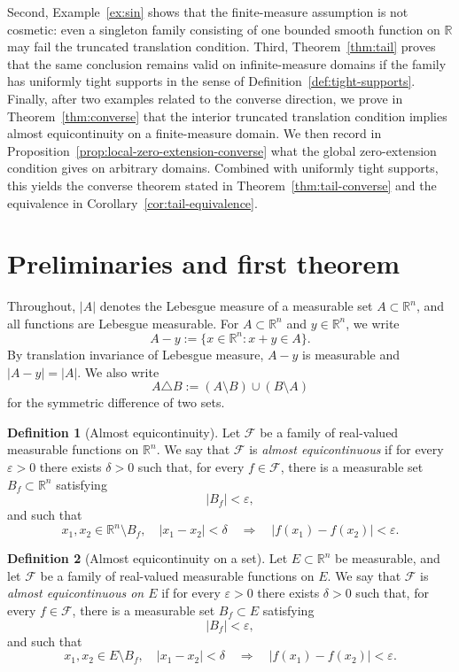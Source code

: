 \documentclass[11pt]{article}
\theoremstyle{plain}
\theoremstyle{definition}
\newtheorem{definition}{Definition}
\theoremstyle{remark}
\newcommand{\R}{\mathbb{R}}
\newcommand{\F}{\mathcal{F}}
\newcommand{\eps}{\varepsilon}
\newcommand{\meas}[1]{\lvert #1\rvert}
\begin{document}
Second, Example~\ref{ex:sin} shows that the finite-measure assumption is not
cosmetic: even a singleton family consisting of one bounded smooth function on
$\R$ may fail the truncated translation condition. Third,
Theorem~\ref{thm:tail} proves that the same conclusion remains valid on
infinite-measure domains if the family has uniformly tight supports in the
sense of Definition~\ref{def:tight-supports}. Finally, after two examples
related to the converse direction, we
prove in Theorem~\ref{thm:converse} that the interior truncated translation
condition implies almost equicontinuity on a finite-measure domain. We then
record in Proposition~\ref{prop:local-zero-extension-converse} what the
global zero-extension condition gives on arbitrary domains. Combined with
uniformly tight supports, this yields the converse theorem stated in
Theorem~\ref{thm:tail-converse} and the equivalence in
Corollary~\ref{cor:tail-equivalence}.

\section{Preliminaries and first theorem}

Throughout, $\meas{A}$ denotes the Lebesgue measure of a measurable set
$A\subset\R^n$, and all functions are Lebesgue measurable. For
$A\subset\R^n$ and $y\in\R^n$, we write
\[
    A-y:=\{x\in\R^n:x+y\in A\}.
\]
By translation invariance of Lebesgue measure, $A-y$ is measurable and
$\meas{A-y}=\meas{A}$. We also write
\[
    A\triangle B := (A\setminus B)\cup(B\setminus A)
\]
for the symmetric difference of two sets.

\begin{definition}[Almost equicontinuity]\label{def:ae}
Let $\F$ be a family of real-valued measurable functions on $\R^n$. We say
that $\F$ is \emph{almost equicontinuous} if for every $\eps>0$ there exists
$\delta>0$ such that, for every $f\in\F$, there is a measurable set
$B_f\subset\R^n$ satisfying
\[
    \meas{B_f}<\eps,
\]
and such that
\[
    x_1,x_2\in\R^n\setminus B_f,\quad |x_1-x_2|<\delta
    \quad\Longrightarrow\quad
    |f(x_1)-f(x_2)|<\eps .
\]
\end{definition}

\begin{definition}[Almost equicontinuity on a set]\label{def:ae-domain}
Let $E\subset\R^n$ be measurable, and let $\F$ be a family of real-valued
measurable functions on $E$. We say that $\F$ is \emph{almost
equicontinuous on $E$} if for every $\eps>0$ there exists $\delta>0$ such
that, for every $f\in\F$, there is a measurable set $B_f\subset E$
satisfying
\[
    \meas{B_f}<\eps,
\]
and such that
\[
    x_1,x_2\in E\setminus B_f,\quad |x_1-x_2|<\delta
    \quad\Longrightarrow\quad
    |f(x_1)-f(x_2)|<\eps .
\]
\end{definition}
\end{document}
